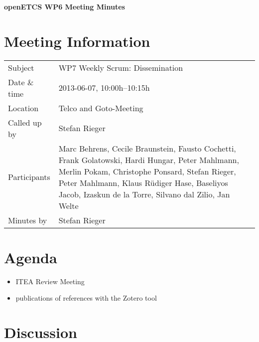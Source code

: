 \documentclass[a4paper, 11pt]{article}
\begin{document}
{\begin{center}\huge\bf openETCS WP6 Meeting Minutes\end{center}}
\section{Meeting Information}

\renewcommand{\arraystretch}{1.5}
\begin{supertabular}{m{.2\textwidth}m{.8\textwidth}}
Subject & WP7 Weekly Scrum: Dissemination\\
Date \& time & 2013-06-07, 10:00h--10:15h\\
Location & Telco and Goto-Meeting\\
Called up by & Stefan Rieger\\
Participants &
Marc Behrens,
Cecile Braunstein,
Fausto Cochetti,
Frank Golatowski,
Hardi Hungar,
Peter Mahlmann,
Merlin Pokam,
Christophe Ponsard,
Stefan Rieger,
Peter Mahlmann,
Klaus R\"udiger Hase,
Baseliyos Jacob,
Izaskun de la Torre,
Silvano dal Zilio,
Jan Welte
\\

Minutes by & Stefan Rieger\\

\end{supertabular}
\renewcommand{\arraystretch}{1.0}


\section{Agenda}
\begin{itemize}
\item ITEA Review Meeting
\item publications of references with the Zotero tool
\end{itemize}

\section{Discussion}
\end{document}
